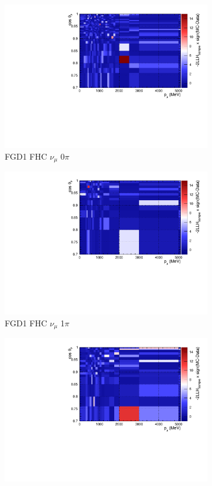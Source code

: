 \begin{figure}
\centering
\begin{subfigure}{.32\textwidth}
  \centering
  \includegraphics[width=0.85\linewidth]{figs/llhcont_FGD1_numuCC_0pi.pdf}
  \caption{FGD1 FHC $\nu_{\mu}$ 0$\pi$}
  \label{fig:llhcont_FGD1_numuCC_0pi}
\end{subfigure}
\begin{subfigure}{.32\textwidth}
  \centering
  \includegraphics[width=0.85\linewidth]{figs/llhcont_FGD1_numuCC_1pi.pdf}
  \caption{FGD1 FHC $\nu_{\mu}$ 1$\pi$}
  \label{fig:llhcont_FGD1_numuCC_1pi}
\end{subfigure}
\begin{subfigure}{.32\textwidth}
  \centering
  \includegraphics[width=0.85\linewidth]{figs/llhcont_FGD1_numuCC_other.pdf}

\end{subfigure}
\end{figure}
